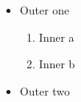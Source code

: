 \documentclass{article}
\begin{document}
\begin{itemize}
\item Outer one
\begin{enumerate}
\item Inner a
\item Inner b
\end{enumerate}
\item Outer two
\end{itemize}
\end{document}
